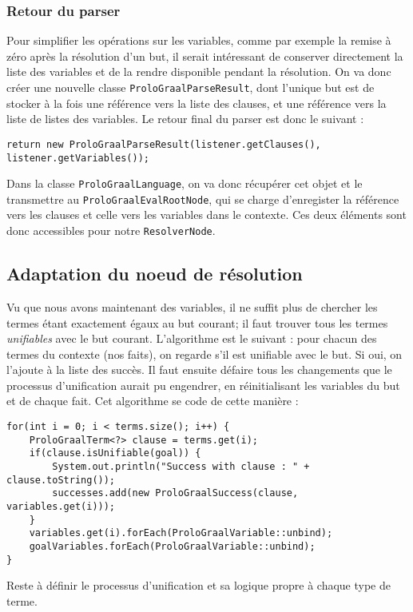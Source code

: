 \documentclass[../report.tex]{subfiles}
\begin{document}
\subsubsection{Retour du parser}\label{subsubsec:phase2parser}
Pour simplifier les opérations sur les variables, comme par exemple la remise à zéro après la résolution d'un but, il serait intéressant de conserver directement la liste des variables et de la rendre disponible pendant la résolution. On va donc créer une nouvelle classe \texttt{ProloGraalParseResult}, dont l'unique but est de stocker à la fois une référence vers la liste des clauses, et une référence vers la liste de listes des variables. Le retour final du parser est donc le suivant : 
\begin{verbatim}
return new ProloGraalParseResult(listener.getClauses(), listener.getVariables());
\end{verbatim}
Dans la classe \texttt{ProloGraalLanguage}, on va donc récupérer cet objet et le transmettre au \texttt{ProloGraalEvalRootNode}, qui se charge d'enregister la référence vers les clauses et celle vers les variables dans le contexte. Ces deux éléments sont donc accessibles pour notre \texttt{ResolverNode}.
\subsection{Adaptation du noeud de résolution}
Vu que nous avons maintenant des variables, il ne suffit plus de chercher les termes étant exactement égaux au but courant; il faut trouver tous les termes \textit{unifiables} avec le but courant. L'algorithme est le suivant : pour chacun des termes du contexte (nos faits), on regarde s'il est unifiable avec le but. Si oui, on l'ajoute à la liste des succès. Il faut ensuite défaire tous les changements que le processus d'unification aurait pu engendrer, en réinitialisant les variables du but et de chaque fait. Cet algorithme se code de cette manière :
\begin{verbatim}
for(int i = 0; i < terms.size(); i++) {
    ProloGraalTerm<?> clause = terms.get(i);
    if(clause.isUnifiable(goal)) {
        System.out.println("Success with clause : " + clause.toString());
        successes.add(new ProloGraalSuccess(clause, variables.get(i)));
    }
    variables.get(i).forEach(ProloGraalVariable::unbind);
    goalVariables.forEach(ProloGraalVariable::unbind);
}
\end{verbatim}
Reste à définir le processus d'unification et sa logique propre à chaque type de terme.
\end{document}
